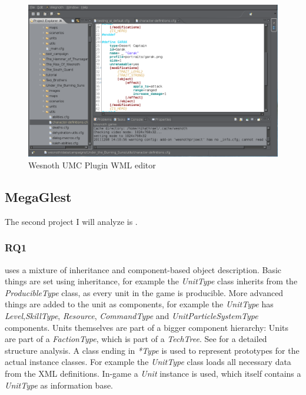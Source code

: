 \begin{figure}[H]
    \centering
    \includegraphics[width=\textwidth]{pics/wesnothumc}
    \caption{Wesnoth UMC Plugin WML editor}
    \label{fig:wesnothumc}
\end{figure}

\pagebreak

\subsection{MegaGlest}
The second project I will analyze is \GLEST{}.

\subsubsection{RQ1}
\GLEST{} uses a mixture of inheritance and component-based object description. Basic things are set using
inheritance, for example the \textit{UnitType} class inherits from the \textit{ProducibleType} class, as every unit in
the game is producible. More advanced things are added to the unit as components, for example the \textit{UnitType} has
\textit{Level},\textit{SkillType}, \textit{Resource}, \textit{CommandType} and \textit{UnitParticleSystemType}
components. Units themselves are part of a bigger component hierarchy: Units are part of a \textit{FactionType}, which
is part of a \textit{TechTree}. See  for a detailed structure analysis. A class ending in
\textit{*Type} is used to represent prototypes for the actual instance classes. For example the \textit{UnitType} class loads all
necessary data from the XML definitions. In-game a \textit{Unit} instance is used, which itself contains a
\textit{UnitType} as information base.

